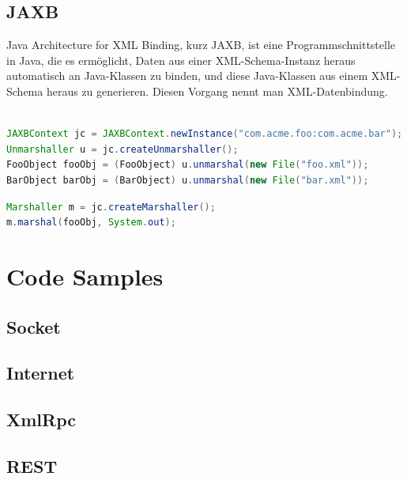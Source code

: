 \documentclass[10pt]{article}
\begin{document}
\subsection{JAXB}
Java Architecture for XML Binding, kurz JAXB, ist eine Programmschnittstelle in Java, die es ermöglicht, Daten aus einer XML-Schema-Instanz heraus automatisch an Java-Klassen zu binden, und diese Java-Klassen aus einem XML-Schema heraus zu generieren. Diesen Vorgang nennt man XML-Datenbindung.
\begin{lstlisting}[language=Java, caption=Unmarshalling, style=JavaStyle]

JAXBContext jc = JAXBContext.newInstance("com.acme.foo:com.acme.bar");
Unmarshaller u = jc.createUnmarshaller();
FooObject fooObj = (FooObject) u.unmarshal(new File("foo.xml"));
BarObject barObj = (BarObject) u.unmarshal(new File("bar.xml"));
\end{lstlisting}

\begin{lstlisting}[language=Java, caption=Marshalling, style=JavaStyle]
Marshaller m = jc.createMarshaller();
m.marshal(fooObj, System.out);
\end{lstlisting}

\newpage
\section{Code Samples}
\subsection{Socket}


\subsection{Internet}


\subsection{XmlRpc}


\subsection{REST}


\end{document}
